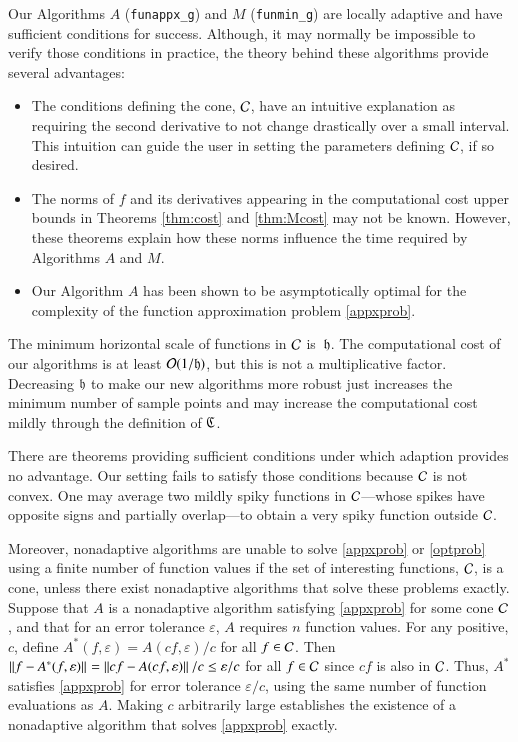 \documentclass[review]{elsarticle}
\newcommand{\abstol}{\varepsilon}
\theoremstyle{definition}
\newcommand{\funappxg}{\texttt{funappx\_g}\xspace}
\newcommand{\funming}{\texttt{funmin\_g}\xspace}
\begin{document}
Our Algorithms $A$ (\funappxg) and $M$ (\funming) are locally adaptive and have
sufficient conditions for success. Although, it may normally be impossible to
verify those conditions in practice, the theory behind these algorithms provide
several advantages: \begin{itemize}
	
\item The conditions defining the cone, $\mathcal{C}$, have an intuitive explanation as
requiring the second derivative to not change drastically over a small interval.
This intuition can guide the user in setting the parameters defining $\mathcal{C}$, if
so desired.
	
\item The norms of $f$ and its derivatives appearing in the computational cost
upper bounds in Theorems \ref{thm:cost} and \ref{thm:Mcost} may not be known.
However, these theorems explain how these norms influence the time required by
Algorithms $A$ and $M$.
	
\item Our Algorithm $A$ has been shown to be asymptotically optimal for the
complexity of the function approximation problem \eqref{appxprob}.
	
\end{itemize}

The minimum horizontal scale of functions in $\mathcal{C}$ is~$\mathfrak{h}$. The computational
cost of our algorithms is at least $\operatorname{{\mathcal O}}(1/\mathfrak{h})$, but this is not a
multiplicative factor. Decreasing $\mathfrak{h}$ to make our new algorithms more robust
just increases the minimum number of sample points and may increase the
computational cost mildly through the definition of $\mathfrak{C}$.

There are theorems providing sufficient conditions under which adaption provides
no advantage. Our setting fails to satisfy those conditions because $\mathcal{C}$ is not
convex. One may average two mildly spiky functions in $\mathcal{C}$---whose spikes have
opposite signs and partially overlap---to obtain a very spiky function outside
$\mathcal{C}$.

Moreover, nonadaptive algorithms are unable to solve \eqref{appxprob} or
\eqref{optprob} using a finite number of function values if the set of
interesting functions, $\mathcal{C}$, is a cone, unless there exist nonadaptive
algorithms that solve these problems exactly. Suppose that $A$ is a nonadaptive
algorithm satisfying \eqref{appxprob} for some cone $\mathcal{C}$, and that for an error
tolerance $\abstol$, $A$ requires $n$ function values. For any positive, $c$,
define $A^*(f,\abstol) = A(cf,\abstol)/c$ for all $f \in \mathcal{C}$. Then $\norm{f -
A^*(f,\abstol)} = \norm{cf - A(cf,\abstol)}/c\le \abstol/c$ for all $f \in \mathcal{C}$
since $cf$ is also in $\mathcal{C}$. Thus, $A^*$ satisfies \eqref{appxprob} for error
tolerance $\abstol/c$, using the same number of function evaluations as $A$.
Making $c$ arbitrarily large establishes the existence of a nonadaptive
algorithm that solves \eqref{appxprob} exactly.
\end{document}
